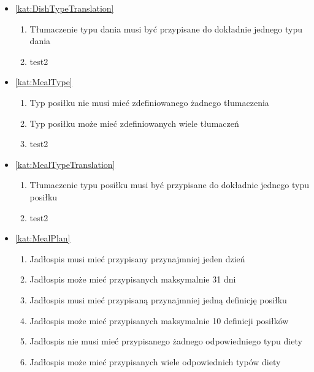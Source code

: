 \begin{itemize}[label={\textbf{Reguły dla}}, wide, labelwidth=!, labelindent=0pt]
\begin{enumerate}[label={\textbf{REG/\protect\threedigits{\arabic{enumi}}}}, wide, labelwidth=!, align=left, leftmargin=3cm, resume]
    \end{enumerate}
    \item\ref{kat:DishTypeTranslation}
    \begin{enumerate}[label={\textbf{REG/\protect\threedigits{\arabic{enumi}}}}, wide, labelwidth=!, align=left, leftmargin=3cm, resume]
        \item Tłumaczenie typu dania musi być przypisane do dokładnie jednego typu dania
        \item test2
    \end{enumerate}
    \item\ref{kat:MealType}
    \begin{enumerate}[label={\textbf{REG/\protect\threedigits{\arabic{enumi}}}}, wide, labelwidth=!, align=left, leftmargin=3cm, resume]
        \item Typ posiłku nie musi mieć zdefiniowanego żadnego tłumaczenia
        \item Typ posiłku może mieć zdefiniowanych wiele tłumaczeń
        \item test2
    \end{enumerate}
    \item\ref{kat:MealTypeTranslation}
    \begin{enumerate}[label={\textbf{REG/\protect\threedigits{\arabic{enumi}}}}, wide, labelwidth=!, align=left, leftmargin=3cm, resume]
        \item Tłumaczenie typu posiłku musi być przypisane do dokładnie jednego typu posiłku
        \item test2
    \end{enumerate}
    \item\ref{kat:MealPlan}
    \begin{enumerate}[label={\textbf{REG/\protect\threedigits{\arabic{enumi}}}}, wide, labelwidth=!, align=left, leftmargin=3cm, resume]
        \item Jadłospis musi mieć przypisany przynajmniej jeden dzień
        \item Jadłospis może mieć przypisanych maksymalnie 31 dni
        \item Jadłospis musi mieć przypisaną przynajmniej jedną definicję posiłku
        \item Jadłospis może mieć przypisanych maksymalnie 10 definicji posiłków
        \item Jadłospis nie musi mieć przypisanego żadnego odpowiedniego typu diety
        \item Jadłospis może mieć przypisanych wiele odpowiednich typów diety

\end{enumerate}
\end{itemize}
